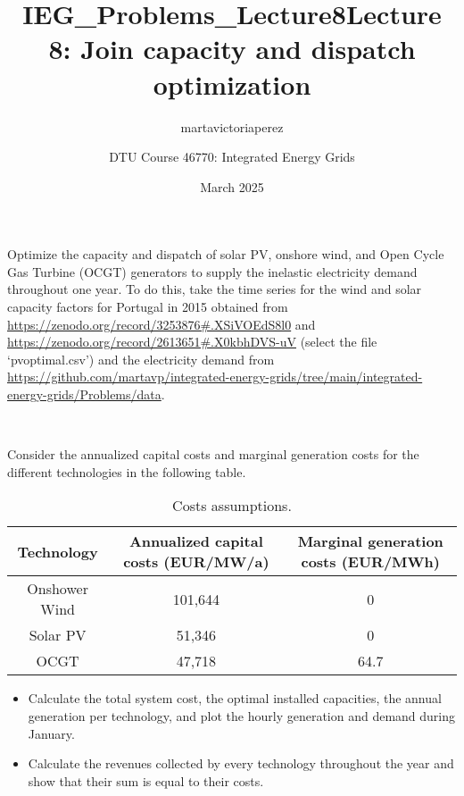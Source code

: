 \documentclass[10pt]{article}
\title{IEG_Problems_Lecture8}
\author{martavictoriaperez }
\date{March 2025}
\newenvironment{problem}[2][Problem]{\begin{trivlist}
\item[\hskip \labelsep {\bfseries #1}\hskip \labelsep {\bfseries #2.}]}{\end{trivlist}}
\begin{document}
 
\title{\textbf{Lecture 8: Join capacity and dispatch optimization}}
\author{
DTU Course 46770: Integrated Energy Grids }
\maketitle

\begin{problem}{8.1}

Optimize the capacity and dispatch of solar PV, onshore wind, and Open Cycle Gas Turbine (OCGT) generators to supply the inelastic electricity demand throughout one year. 
To do this, take the time series for the wind and solar capacity factors for Portugal in 2015 obtained from \url{https://zenodo.org/record/3253876#.XSiVOEdS8l0}
and \url{https://zenodo.org/record/2613651#.X0kbhDVS-uV} (select the file ‘pvoptimal.csv’) and the electricity demand from \url{https://github.com/martavp/integrated-energy-grids/tree/main/integrated-energy-grids/Problems/data}.

\

Consider the annualized capital costs and marginal generation costs for the different technologies in the following table.


\begin{table}[h]
    \centering
    \begin{tabular}{ccc}
    \hline
        Technology & Annualized capital costs (EUR/MW/a) & Marginal generation costs (EUR/MWh) \\
    \hline
    Onshower Wind &  101,644 & 0 \\
         Solar PV &  51,346 & 0 \\
         OCGT & 47,718 &  64.7  \\
    \hline
    \end{tabular}
    \caption{Costs assumptions.}
    \label{tab:my_label}
\end{table}
\begin{itemize}
\item[a)] Calculate the total system cost, the optimal installed capacities, the annual generation per technology, and plot the hourly generation and demand during January.
\item[b)] Calculate the revenues collected by every technology throughout the year and show that their sum is equal to their costs. 
\end{itemize}

\end{problem}
\end{document}
